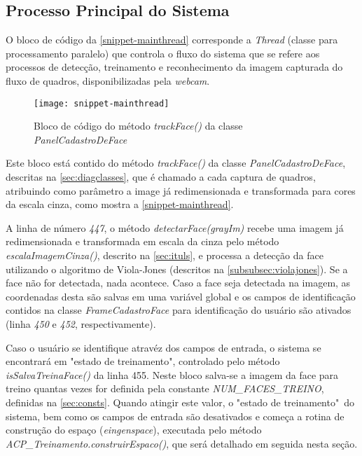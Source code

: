 \subsection{Processo Principal do Sistema}\label{sec:mainthread}

O bloco de código da \autoref{snippet-mainthread} corresponde a \textit{Thread} (classe para processamento paralelo) que controla o fluxo do sistema que se refere aos processos de detecção, treinamento e reconhecimento da imagem capturada do fluxo de quadros, disponibilizadas pela \textit{webcam}.

\begin{figure}[h]
	\centering
	\texttt{[image: snippet-mainthread]}
	\caption{Bloco de código do método \textit{trackFace()} da classe \textit{PanelCadastroDeFace}}
	\label{snippet-mainthread}
\end{figure}

Este bloco está contido do método \textit{trackFace()} da classe \textit{PanelCadastroDeFace}, descritas na \autoref{sec:diagclasses}, que é chamado a cada captura de quadros, atribuindo como parâmetro a image já redimensionada e transformada para cores da escala cinza, como mostra a  \autoref{snippet-mainthread}.

A linha de número \textit{447}, o método \textit{detectarFace(grayIm)} recebe uma imagem já redimensionada e transformada em escala da cinza pelo método \textit{escalaImagemCinza()}, descrito na \autoref{sec:ituls}, e processa a detecção da face utilizando o algoritmo de Viola-Jones (descritos na \autoref{subsubsec:violajones}). Se a face não for detectada, nada acontece. Caso a face seja detectada na imagem, as coordenadas desta são salvas em uma variável global e os campos de identificação contidos na classe \textit{FrameCadastroFace} para identificação do usuário são ativados  (linha \textit{450} e \textit{452}, respectivamente). 

Caso o usuário se identifique atravéz dos campos de entrada, o sistema se encontrará em "estado de treinamento", controlado pelo método \textit{isSalvaTreinaFace()} da linha 455. Neste bloco salva-se a imagem da face para treino quantas vezes for definida pela constante \textit{NUM\_FACES\_TREINO}, definidas na \autoref{sec:consts}. Quando atingir este valor, o "estado de treinamento"\ do sistema, bem como os campos de entrada são desativados e começa a rotina de construção do espaço (\textit{eingenspace}), executada pelo método \textit{ACP\_Treinamento.construirEspaco()}, que será detalhado em seguida nesta seção.

